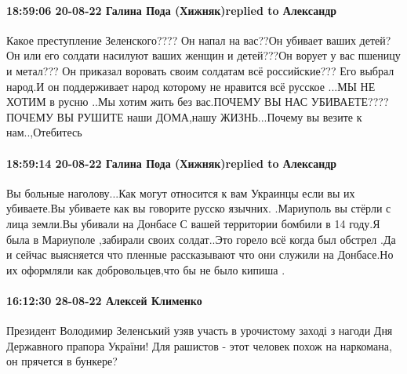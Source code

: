  
 
 
 
 

\paragraph{18:59:06 20-08-22 Галина Пода (Хижняк)replied to Александр}

Какое преступление Зеленского???? Он напал на вас??Он убивает ваших детей? Он
или его солдати насилуют ваших женщин и детей???Он ворует у вас пшеницу и
метал??? Он приказал воровать своим солдатам всё российские??? Его выбрал
народ.И он поддерживает народ которому не нравится всё русское ...МЫ НЕ ХОТИМ в
русню ..Мы хотим жить без вас.ПОЧЕМУ ВЫ НАС УБИВАЕТЕ????ПОЧЕМУ ВЫ РУШИТЕ наши
ДОМА,нашу ЖИЗНЬ...Почему вы везите к нам..,Отебитесь

\paragraph{18:59:14 20-08-22 Галина Пода (Хижняк)replied to Александр}

Вы больные наголову...Как могут относится к вам Украинцы если вы их убиваете.Вы
убиваете как вы говорите русско язычних. .Мариуполь вы стёрли с лица земли.Вы
убивали на Донбасе С вашей территории бомбили в 14 году.Я была в Мариуполе
,забирали своих солдат..Это горело всё когда был обстрел .Да и сейчас
выясняется что пленные рассказывают что они служили на Донбасе.Но их оформляли
как добровольцев,что бы не было кипиша .

\paragraph{16:12:30 28-08-22 Алексей Клименко}

Президент Володимир Зеленський узяв участь в урочистому заході з нагоди Дня
Державного прапора України! Для рашистов - этот человек похож на наркомана, он
прячется в бункере?


